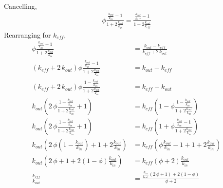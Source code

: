 \documentclass{article}
\begin{document}
Cancelling,
\begin{align*}
\phi\frac{\frac{k_{out}}{k_{in}}-1}{1+2\frac{k_{out}}{k_{in}}} = \frac{\frac{k_{out}}{k_{eff}}-1}{1+2\frac{k_{out}}{k_{eff}}}
\end{align*}
Rearranging for $k_{eff}$,
\begin{align*}
  \phi\frac{\frac{k_{out}}{k_{in}}-1}{1+2\frac{k_{out}}{k_{in}}} &= \frac{k_{out}-k_{eff}}{k_{eff}+2\,k_{out}}
  \\
  (k_{eff}+2\,k_{out})\phi\frac{\frac{k_{out}}{k_{in}}-1}{1+2\frac{k_{out}}{k_{in}}} &= k_{out}-k_{eff}
  \\
  (k_{eff}+2\,k_{out})\phi\frac{1-\frac{k_{out}}{k_{in}}}{1+2\frac{k_{out}}{k_{in}}} &= k_{eff}-k_{out}
  \\
  k_{out}\left(2\,\phi\frac{1-\frac{k_{out}}{k_{in}}}{1+2\frac{k_{out}}{k_{in}}}+1\right) &= k_{eff}\left(1-\phi\frac{1-\frac{k_{out}}{k_{in}}}{1+2\frac{k_{out}}{k_{in}}}\right)
  \\
  k_{out}\left(2\,\phi\frac{1-\frac{k_{out}}{k_{in}}}{1+2\frac{k_{out}}{k_{in}}}+1\right) &= k_{eff}\left(1+\phi\frac{\frac{k_{out}}{k_{in}}-1}{1+2\frac{k_{out}}{k_{in}}}\right)
  \\
  k_{out}\left(2\,\phi\left(1-\frac{k_{out}}{k_{in}}\right)+1+2\frac{k_{out}}{k_{in}}\right) &= k_{eff}\left(\phi\frac{k_{out}}{k_{in}}-1+1+2\frac{k_{out}}{k_{in}}\right)
  \\
  k_{out}\left(2\,\phi+1+2(1-\phi)\frac{k_{out}}{k_{in}}\right) &= k_{eff}\left(\phi+2\right)\frac{k_{out}}{k_{in}}
  \\
  \frac{k_{eff}}{k_{out}}&=\frac{\frac{k_{in}}{k_{out}}(2\,\phi+1)+2(1-\phi)}{\phi+2}
\end{align*}
\end{document}
